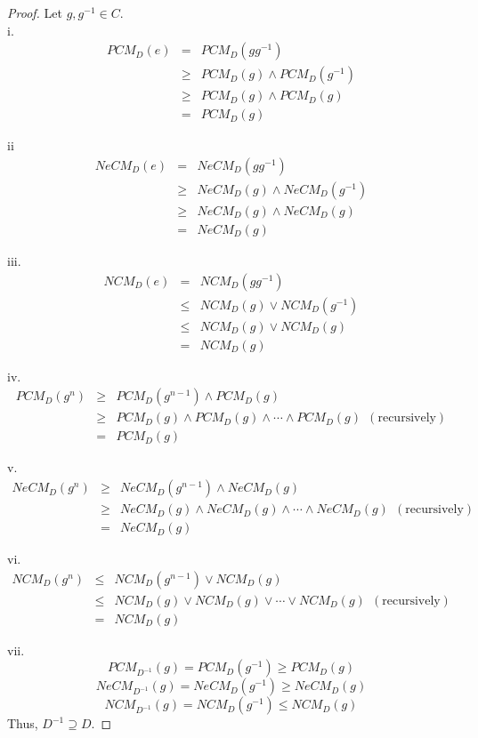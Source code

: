 \documentclass[12pt,letterpaper]{amsart}
\theoremstyle{plain}
\theoremstyle{definition}
\numberwithin{equation}{section}
\begin{document}
\begin{proof}
Let $g, g^{-1} \in C.$\\
i. 
\begin{eqnarray*}
PCM_{D}(e) & = & PCM_{D}(g g^{-1})\\
& \geq & PCM_{D}(g) \wedge PCM_{D}(g^{-1}) \\
& \geq & PCM_{D}(g) \wedge PCM_{D}(g)\\
& = & PCM_{D}(g)
\end{eqnarray*}

ii \begin{eqnarray*}
NeCM_{D}(e) & = & NeCM_{D}(g g^{-1})\\
& \geq & NeCM_{D}(g) \wedge NeCM_{D}(g^{-1}) \\
& \geq & NeCM_{D}(g) \wedge NeCM_{D}(g)\\
& = & NeCM_{D}(g)
\end{eqnarray*}

iii. \begin{eqnarray*}
NCM_{D}(e) & = & NCM_{D}(g g^{-1})\\
& \leq & NCM_{D}(g) \vee NCM_{D}(g^{-1}) \\
& \leq & NCM_{D}(g) \vee NCM_{D}(g)\\
& = & NCM_{D}(g)
\end{eqnarray*}

iv. \begin{eqnarray*}
PCM_{D}(g^n) & \geq & PCM_{D}(g^{n-1}) \wedge PCM_{D}(g)\\
& \geq & PCM_{D}(g) \wedge PCM_{D}(g) \wedge \cdots \wedge PCM_{D}(g)~~ (\text{recursively}) \\
& = & PCM_{D}(g)
\end{eqnarray*}

v.  \begin{eqnarray*}
NeCM_{D}(g^n) & \geq & NeCM_{D}(g^{n-1}) \wedge NeCM_{D}(g)\\
& \geq & NeCM_{D}(g) \wedge NeCM_{D}(g) \wedge \cdots \wedge NeCM_{D}(g)~~ (\text{recursively}) \\
& = & NeCM_{D}(g)
\end{eqnarray*}

vi.  \begin{eqnarray*}
NCM_{D}(g^n) & \leq & NCM_{D}(g^{n-1}) \vee NCM_{D}(g)\\
& \leq & NCM_{D}(g) \vee NCM_{D}(g) \vee \cdots \vee NCM_{D}(g)~~ (\text{recursively}) \\
& = & NCM_{D}(g)
\end{eqnarray*}

vii. $$PCM_{D^{-1}}(g) = PCM_{D}(g^{-1}) \geq PCM_D(g)$$
$$NeCM_{D^{-1}}(g) = NeCM_{D}(g^{-1}) \geq NeCM_D(g)$$
$$NCM_{D^{-1}}(g) = NCM_{D}(g^{-1}) \leq NCM_D(g)$$ Thus, $D^{-1} \supseteq D.$
\end{proof}
\end{document}
